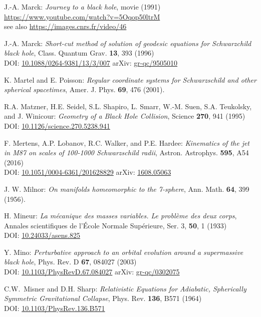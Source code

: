 \begin{thebibliography}{123}
J.-A. Marck:
{\em Journey to a black hole}, movie (1991)\\
\url{https://www.youtube.com/watch?v=5Oqop50ltrM}\\
see also \url{https://images.cnrs.fr/video/46}

J.-A. Marck:
{\em Short-cut method of solution of geodesic equations for Schwarzchild black hole},
Class. Quantum Grav. {\bf 13}, 393 (1996)\\
DOI: \href{https://doi.org/10.1088/0264-9381/13/3/007}{10.1088/0264-9381/13/3/007}\hfill
arXiv: \href{https://arxiv.org/abs/gr-qc/9505010}{gr-qc/9505010}

K. Martel and E. Poisson:
\emph{Regular coordinate systems for Schwarzschild and other spherical spacetimes},
Amer. J. Phys. {\bf 69}, 476 (2001).

R.A. Matzner, H.E. Seidel, S.L. Shapiro, L. Smarr, W.-M. Suen, S.A. Teukolsky, and
J. Winicour: {\em Geometry of a Black Hole Collision},
Science {\bf 270}, 941 (1995)\\
DOI: \href{https://doi.org/10.1126/science.270.5238.941}{10.1126/science.270.5238.941}

F. Mertens, A.P. Lobanov, R.C. Walker, and P.E. Hardee:
{\em Kinematics of the jet in M87 on scales of 100-1000 Schwarzschild radii},
Astron. Astrophys. {\bf 595}, A54 (2016)\\
DOI: \href{https://doi.org/10.1051/0004-6361/201628829}{10.1051/0004-6361/201628829}\hfill
arXiv: \href{https://arxiv.org/abs/1608.05063}{1608.05063}

J. W. Milnor: {\em On manifolds homeomorphic to the 7-sphere},
Ann. Math. {\bf 64}, 399 (1956).

H. Mineur: {\em La mécanique des masses variables. Le problème des deux corps},
Annales scientifiques de l'École Normale Supérieure, Ser. 3, {\bf 50}, 1 (1933)\\
DOI: \href{https://doi.org/10.24033/asens.825}{10.24033/asens.825}

Y. Mino:
{\em Perturbative approach to an orbital evolution around a supermassive black hole},
Phys. Rev. D {\bf 67}, 084027 (2003)\\
DOI: \href{https://doi.org/10.1103/PhysRevD.67.084027}{10.1103/PhysRevD.67.084027}\hfill
arXiv: \href{https://arxiv.org/abs/gr-qc/0302075}{gr-qc/0302075}

C.W.~Misner and D.H. Sharp:
{\em Relativistic Equations for Adiabatic, Spherically Symmetric Gravitational Collapse},
Phys. Rev. {\bf 136}, B571 (1964)\\
DOI: \href{https://doi.org/10.1103/PhysRev.136.B571}{10.1103/PhysRev.136.B571}


\end{thebibliography}
